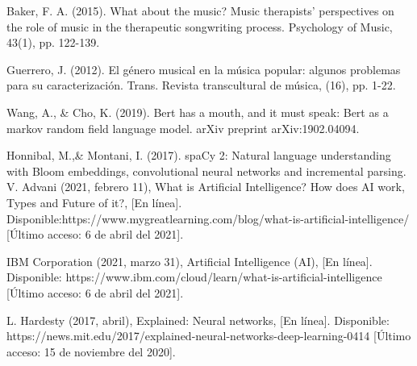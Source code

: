 \documentclass[12pt, a4paper, titlepage]{report}
\begin{document}
\begin{thebibliography}{20}
	Baker, F. A. (2015). What about the music? Music therapists’ perspectives on the role of music in the therapeutic songwriting process. Psychology of Music, 43(1), pp. 122-139.
	
	Guerrero, J. (2012). El género musical en la música popular: algunos problemas para su caracterización. Trans. Revista transcultural de música, (16), pp. 1-22.
	
	Wang, A., \& Cho, K. (2019). Bert has a mouth, and it must speak: Bert as a markov random field language model. arXiv preprint arXiv:1902.04094.
	
	Honnibal, M.,\& Montani, I. (2017). spaCy 2: Natural language understanding with Bloom embeddings, convolutional neural networks and incremental parsing.
	V. Advani (2021, febrero 11), What is Artificial Intelligence? How does AI work, Types and Future of it?, [En línea]. Disponible:https://www.mygreatlearning.com/blog/what-is-artificial-intelligence/ [Último acceso: 6 de abril del 2021].
	
	IBM Corporation (2021, marzo 31), Artificial Intelligence (AI), [En línea]. Disponible: https://www.ibm.com/cloud/learn/what-is-artificial-intelligence [Último acceso: 6 de abril del 2021].
	
	L. Hardesty  (2017, abril), Explained: Neural networks, [En línea]. Disponible: https://news.mit.edu/2017/explained-neural-networks-deep-learning-0414 [Último acceso: 15 de noviembre del 2020].	
	

\end{thebibliography}
\end{document}
